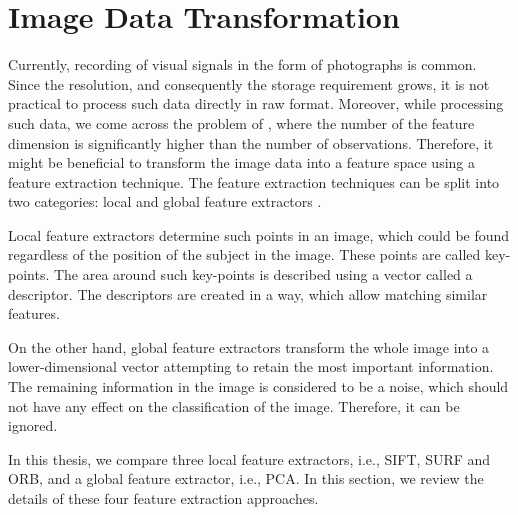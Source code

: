 \chapter{Image Data Transformation}

Currently, recording of visual signals in the form of photographs is common. Since the resolution, and consequently the storage requirement grows, it is not practical to process such data directly in raw format. Moreover, while processing such data, we come across the problem of , where the number of the feature dimension is significantly higher than the number of observations. Therefore, it might be beneficial to transform the image data into a feature space using a feature extraction technique. The feature extraction techniques can be split into two categories: local and global feature extractors \cite{lee2005}.

Local feature extractors determine such points in an image, which could be found regardless of the position of the subject in the image. These points are called key-points. The area around such key-points is described using a vector called a descriptor. The descriptors are created in a way, which allow matching similar features.

On the other hand, global feature extractors transform the whole image into a lower-dimensional vector attempting to retain the most important information. The remaining information in the image is considered to be a noise, which should not have any effect on the classification of the image. Therefore, it can be ignored.

In this thesis, we compare three local feature extractors, i.e., SIFT, SURF and ORB, and a global feature extractor, i.e., PCA. In this section, we review the details of these four feature extraction approaches.











